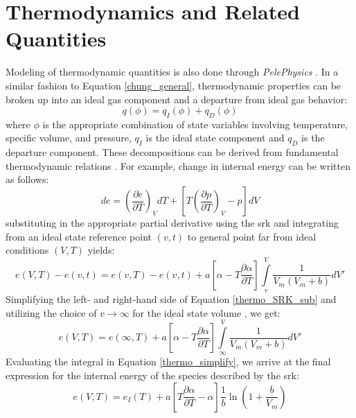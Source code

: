 \section{Thermodynamics and Related Quantities}
Modeling of thermodynamic quantities is also done through \textit{PelePhysics} \cite{PelePhysics}. In a similar fashion to Equation \eqref{chung_general}, thermodynamic properties can be broken up into an ideal gas component and a departure from ideal gas behavior:
\begin{equation} \label{thermo_general}
q(\phi) = q_{I}(\phi) + q_{D}(\phi)
\end{equation}
where $\phi$ is the appropriate combination of state variables involving temperature, specific volume, and pressure, $q_{I}$ is the ideal state component and $q_{D}$ is the departure component. These decompositions can be derived from fundamental thermodynamic relations \cite{batchelor_2000}. For example, change in internal energy can be written as follows:
\begin{equation} \label{thermo_example}
de = \left( \dfrac{\partial e}{\partial T} \right)_{V} dT + \left[ T \left( \dfrac{\partial p}{\partial T} \right)_{V} - p  \right] dV
\end{equation}
substituting in the appropriate partial derivative using the \gls{srk} and integrating from an ideal state reference point $(v,t)$ to general point far from ideal conditions $(V,T)$ yields:
\begin{equation}  \label{thermo_SRK_sub}
e(V,T) - e(v,t) =  e(v,T) - e(v,t) + a \left[ \alpha - T \dfrac{\partial \alpha}{\partial T} \right] \int\limits_{v}^{V} \dfrac{1}{V_m(V_m + b)}dV'
\end{equation}
Simplifying the left- and right-hand side of Equation \eqref{thermo_SRK_sub} and utilizing the choice of $v \to \infty$ for the ideal state volume \cite{}, we get:
\begin{equation} \label{thermo_simplify}
e(V,T) =  e(\infty,T) + a \left[ \alpha - T \dfrac{\partial \alpha}{\partial T} \right] \int\limits_{\infty}^{V} \dfrac{1}{V_m(V_m + b)}dV'
\end{equation}
Evaluating the integral in Equation \eqref{thermo_simplify}, we arrive at the final expression for the internal energy of the species described by the \gls{srk}: 
\begin{equation} \label{thermo_final}
e(V,T) =  e_I(T) + a \left[ T \dfrac{\partial \alpha}{\partial T} - \alpha \right] \dfrac{1}{b}\ln\left( 1 + \dfrac{b}{V_m} \right)
\end{equation}
